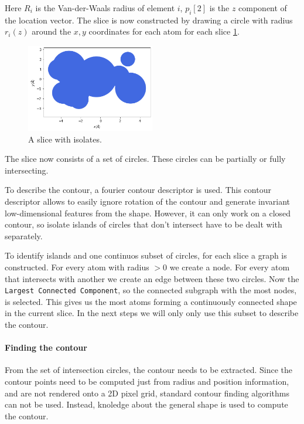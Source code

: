 Here $R_i$ is the Van-der-Waals radius of element $i$, $p_i[2]$ is the $z$ component of the location vector.
The slice is now constructed by drawing a circle with radius $r_i(z)$ around the $x,y$ coordinates for each atom for each slice \ref{fig:slice}.

\begin{figure} [h]
  \centering
  \includegraphics[width=0.5\textwidth]{figures/fourier/slice-iso.png} %
  \caption{A slice with isolates.}
  \label{fig:slice}
\end{figure}

The slice now consists of a set of circles.
These circles can be partially or fully intersecting. 

To describe the contour, a fourier contour descriptor is used.
This contour descriptor allows to easily ignore rotation of the contour and generate invariant low-dimensional features from the shape.
However, it can only work on a closed contour, so isolate islands of circles that don't intersect have to be dealt with separately.

To identify islands and one continuos subset of circles, for each slice a graph is constructed.
For every atom with radius $>0$ we create a node.
For every atom that intersects with another we create an edge between these two circles.
Now the \texttt{Largest Connected Component}, so the connected subgraph with the most nodes, is selected.
This gives us the most atoms forming a continuously connected shape in the current slice.
In the next steps we will only only use this subset to describe the contour.

\paragraph{Finding the contour}

From the set of intersection circles, the contour needs to be extracted. 
Since the contour points need to be computed just from radius and position information, and are not rendered onto a 2D pixel grid, standard contour finding algorithms can not be used.
Instead, knoledge about the general shape is used to compute the contour. 


